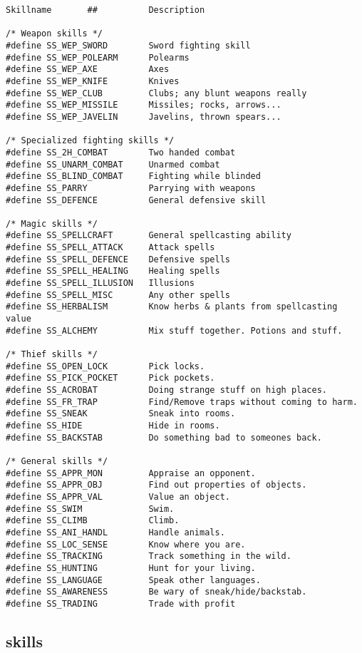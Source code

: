\begin{verbatim}
Skillname       ##          Description

/* Weapon skills */
#define SS_WEP_SWORD        Sword fighting skill
#define SS_WEP_POLEARM      Polearms
#define SS_WEP_AXE          Axes
#define SS_WEP_KNIFE        Knives
#define SS_WEP_CLUB         Clubs; any blunt weapons really
#define SS_WEP_MISSILE      Missiles; rocks, arrows...
#define SS_WEP_JAVELIN      Javelins, thrown spears...

/* Specialized fighting skills */
#define SS_2H_COMBAT        Two handed combat
#define SS_UNARM_COMBAT     Unarmed combat
#define SS_BLIND_COMBAT     Fighting while blinded
#define SS_PARRY            Parrying with weapons
#define SS_DEFENCE          General defensive skill

/* Magic skills */
#define SS_SPELLCRAFT       General spellcasting ability
#define SS_SPELL_ATTACK     Attack spells
#define SS_SPELL_DEFENCE    Defensive spells
#define SS_SPELL_HEALING    Healing spells
#define SS_SPELL_ILLUSION   Illusions
#define SS_SPELL_MISC       Any other spells
#define SS_HERBALISM        Know herbs & plants from spellcasting value
#define SS_ALCHEMY          Mix stuff together. Potions and stuff.

/* Thief skills */
#define SS_OPEN_LOCK        Pick locks.
#define SS_PICK_POCKET      Pick pockets.
#define SS_ACROBAT          Doing strange stuff on high places.
#define SS_FR_TRAP          Find/Remove traps without coming to harm.
#define SS_SNEAK            Sneak into rooms.
#define SS_HIDE             Hide in rooms.
#define SS_BACKSTAB         Do something bad to someones back.

/* General skills */
#define SS_APPR_MON         Appraise an opponent.
#define SS_APPR_OBJ         Find out properties of objects.
#define SS_APPR_VAL         Value an object.
#define SS_SWIM             Swim.
#define SS_CLIMB            Climb.
#define SS_ANI_HANDL        Handle animals.
#define SS_LOC_SENSE        Know where you are.
#define SS_TRACKING         Track something in the wild.
#define SS_HUNTING          Hunt for your living.
#define SS_LANGUAGE         Speak other languages.
#define SS_AWARENESS        Be wary of sneak/hide/backstab.
#define SS_TRADING          Trade with profit
\end{verbatim}


\subsection{skills}

